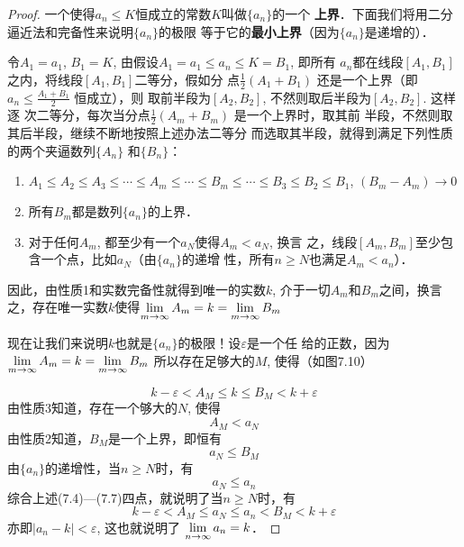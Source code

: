 \begin{proof}
    一个使得$a_n\le K$恒成立的常数$K$叫做$\{a_n\}$的一个
\textbf{上界}．下面我们将用二分逼近法和完备性来说明$\{a_n\}$的极限
等于它的\textbf{最小上界}（因为$\{a_n\}$是递增的）．

令$A_1=a_1$, $B_1=K$, 由假设$A_1=a_1\le a_n\le K=B_1$, 即所有
$a_n$都在线段$[A_1,B_1]$之内，将线段$[A_1,B_1]$二等分，假如分
点$\frac{1}{2}(A_1+B_1)$
还是一个上界（即$a_n\le \frac{A_1+B_1}{2}$
恒成立），则
取前半段为$[A_2,B_2]$, 不然则取后半段为$[A_2,B_2]$. 这样逐
次二等分，每次当分点$\frac{1}{2}(A_m+B_m)$
是一个上界时，取其前
半段，不然则取其后半段，继续不断地按照上述办法二等分
而选取其半段，就得到满足下列性质的两个夹逼数列$\{A_n\}$
和$\{B_n\}$：

\begin{enumerate}
    \item $A_1\le A_2\le A_3\le \cdots \le A_m\le \cdots \le B_m\le \cdots\le B_3\le B_2\le B_1$, $(B_m-A_m)\to 0$
    \item 所有$B_m$都是数列$\{a_n\}$的上界．
    \item 对于任何$A_m$, 都至少有一个$a_N$使得$A_m<a_N$, 换言
之，线段$[A_m,B_m]$至少包含一个点，比如$a_N$（由$\{a_n\}$的递增
性，所有$n\ge N$也满足$A_m<a_n$）．
\end{enumerate}

因此，由性质1和实数完备性就得到唯一的实数$k$, 
介于一切$A_m$和$B_m$之间，换言之，存在唯一实数$k$使得$\displaystyle\lim_{m\to\infty}A_m=k=\displaystyle\lim_{m\to\infty}B_m$

现在让我们来说明$k$也就是$\{a_n\}$的极限！设$\varepsilon$是一个任
给的正数，因为$\displaystyle\lim_{m\to\infty}A_m=k=\displaystyle\lim_{m\to\infty}B_m$
所以存在足够大的$M$, 使得（如图7.10）
\begin{figure}[htp]
    \centering

    \caption{}
\end{figure}
\begin{equation}
    k-\varepsilon<A_M\le k\le B_M<k+\varepsilon
\end{equation}
由性质3知道，存在一个够大的$N$, 使得
\begin{equation}
    A_M<a_N    
\end{equation}
由性质2知道，$B_M$是一个上界，即恒有
\begin{equation}
    a_N\le B_M
\end{equation} 
由$\{a_n\}$的递增性，当$n\ge N$时，有
\begin{equation}
    a_N\le a_n
\end{equation} 
综合上述(7.4)---(7.7)四点，就说明了当$n\ge N$时，有
\[k-\varepsilon<A_M\le a_N\le a_n<B_M<k+\varepsilon\]
亦即$|a_n-k|<\varepsilon$, 这也就说明了
$\displaystyle\lim_{n\to\infty}a_n=k$．
\end{proof}


